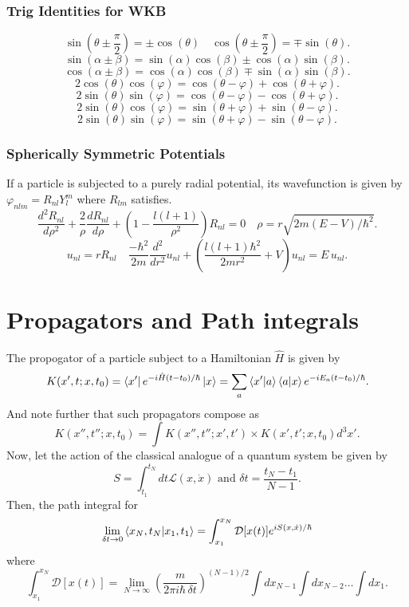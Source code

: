 \documentclass{article}
\begin{document}
    \subsubsection*{Trig Identities for WKB}
      \[
        \sin(\theta \pm \frac{ \pi}{2}) = \pm\cos(\theta) \quad
        \cos(\theta \pm \frac{\pi}{2}) = \mp\sin(\theta)
      .\] 
      \[
        \sin(\alpha \pm \beta) = \sin(\alpha)\cos(\beta) \pm \cos(\alpha)\sin(\beta)
      .\] 
      \[
        \cos(\alpha \pm \beta) = \cos(\alpha)\cos(\beta) \mp \sin(\alpha) \sin(\beta)
      .\] 
      \[
        2\cos(\theta)\cos(\varphi) = \cos(\theta - \varphi) + \cos(\theta + \varphi)
      .\] 
       \[
         2\sin(\theta)\sin(\varphi) = \cos(\theta - \varphi) - \cos(\theta + \varphi)
      .\] 
      \[
        2 \sin(\theta)\cos(\varphi) = \sin(\theta + \varphi) + \sin(\theta - \varphi)
      .\] 
      \[
        2\sin(\theta)\sin(\varphi) = \sin(\theta + \varphi) - \sin(\theta - \varphi)
      .\] 

  \subsubsection*{Spherically Symmetric Potentials}
    If a particle is subjected to a purely radial potential, its wavefunction
    is given by $\varphi_{nlm} = R_{nl}Y_l^m$ where  $R_{lm}$ satisfies.
    \[
      \frac{d^2 R_{nl}}{d\rho^2} + \frac{2}{\rho}\frac{d R_{nl}}{d\rho} + 
      (1 - \frac{l (l+1)}{\rho^2})R_{nl} = 0 \quad \rho = r\sqrt{2m(E-V)/\hbar^2} 
    .\] 
    \[
      u_{nl} = r R_{nl} \quad \frac{-\hbar^2}{2m}\frac{d^2}{dr^2}u_{nl} + 
      \left(\frac{l(l+1)\hbar^2}{2mr^2}+V\right)u_{nl} = E\, u_{nl}
    .\] 
  \section*{Propagators and Path integrals}
    The propogator of a particle subject to a Hamiltonian $\hat H $ is given by 
     \[
       K(x',t;x,t_0) = \bra{x'} e^{- i \hat{H}(t-t_0)/\hbar} \ket{x} = 
       \sum_a \bra{x'}\ket{a}\bra{a}\ket{x}e^{-i E_a (t - t_0)/\hbar}
    .\] 
    And note further that such propagators compose as 
    \[
      K(x'',t'';x,t_0) = \int K(x'',t'';x',t') \times K(x',t';x,t_0)d^3 x'
    .\] 
    Now, let the action of the classical analogue of a quantum system be given by 
    \[
      S = \int_{t_1}^{t_N} dt \mathcal{L}(x,\dot x) \text{ and }  \delta t = \frac{t_N - t_{1}}{N - 1}
    .\] 
    Then, the path integral for 
    \[
      \lim_{\delta t \rightarrow 0} \bra{x_N,t_N}\ket{x_1,t_1} = 
      \int_{x_1}^{x_N} \mathcal{D}[x(t)] e^{i S(x,\dot x) / \hbar}
    \]
    where \[
      \int_{x_1}^{x_N}\mathcal{D}[x(t)] = \lim_{N \rightarrow \infty}
      (\frac{m}{2 \pi i \hbar  \,\delta t})^{(N-1)/2} 
      \int dx_{N-1} \int dx_{N-2} \dots \int dx_1 
    .\] 
\end{document}
